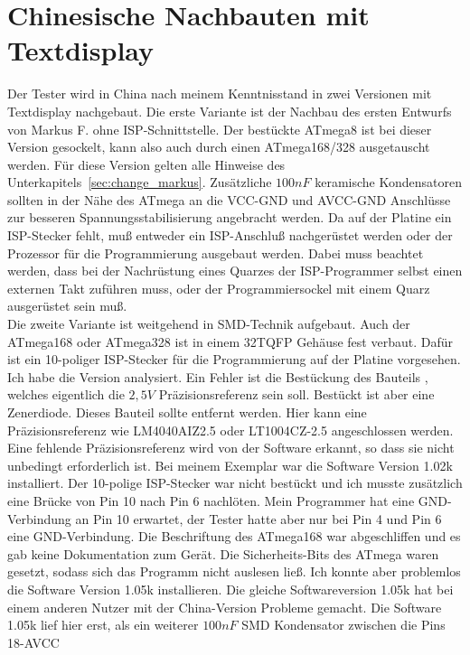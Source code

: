 \section{Chinesische Nachbauten mit Textdisplay}
Der Tester wird in China nach meinem Kenntnisstand in zwei Versionen mit Textdisplay nachgebaut.
Die erste Variante ist der Nachbau des ersten Entwurfs von Markus F. ohne ISP-Schnittstelle.
Der bestückte ATmega8 ist bei dieser Version gesockelt, kann also auch durch einen ATmega168/328 ausgetauscht werden.
Für diese Version gelten alle Hinweise des Unterkapitels~\ref{sec:change_markus}.
Zusätzliche \(100nF\) keramische Kondensatoren sollten in der Nähe des ATmega an die VCC-GND und
AVCC-GND Anschlüsse zur besseren Spannungsstabilisierung angebracht werden.
Da auf der Platine ein ISP-Stecker fehlt, muß entweder ein ISP-Anschluß nachgerüstet werden oder
der Prozessor für die Programmierung ausgebaut werden.
Dabei muss beachtet werden, dass bei der Nachrüstung eines Quarzes der ISP-Programmer selbst
einen externen Takt zuführen muss, oder der Programmiersockel mit einem Quarz ausgerüstet sein muß.\\
Die zweite Variante ist weitgehend in SMD-Technik aufgebaut. Auch der ATmega168 oder ATmega328 
ist in einem 32TQFP Gehäuse fest verbaut.
Dafür ist ein 10-poliger ISP-Stecker für die Programmierung auf der Platine vorgesehen.
Ich habe die Version  analysiert. Ein Fehler ist die Bestückung des Bauteils ,
welches eigentlich die \(2,5V\) Präzisionsreferenz sein soll. Bestückt ist aber eine Zenerdiode.
Dieses Bauteil sollte entfernt werden. Hier kann eine Präzisionsreferenz wie LM4040AIZ2.5 oder
LT1004CZ-2.5 angeschlossen werden. Eine fehlende Präzisionsreferenz wird von der Software erkannt,
so dass sie nicht unbedingt erforderlich ist.
Bei meinem Exemplar war die Software Version 1.02k installiert. Der 10-polige ISP-Stecker war nicht
bestückt und ich musste zusätzlich eine Brücke von Pin 10 nach Pin 6 nachlöten. Mein Programmer hat eine 
GND-Verbindung an Pin 10 erwartet, der Tester hatte aber nur bei Pin 4 und Pin 6 eine GND-Verbindung.
Die Beschriftung des ATmega168 war abgeschliffen und es gab keine Dokumentation zum Gerät.
Die Sicherheits-Bits des ATmega waren gesetzt, sodass sich das Programm nicht auslesen ließ.
Ich konnte aber problemlos die Software Version 1.05k installieren.
Die gleiche Softwareversion 1.05k hat bei einem anderen Nutzer mit der China-Version  Probleme
gemacht. Die Software 1.05k lief hier erst, als ein weiterer \(100nF\) SMD Kondensator zwischen die Pins 18-AVCC
